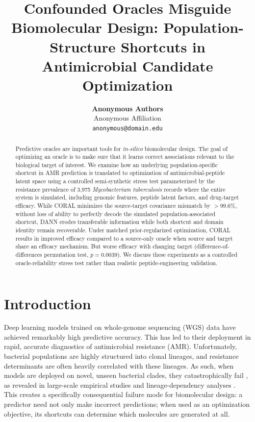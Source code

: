 \documentclass{article}
\title{Confounded Oracles Misguide Biomolecular Design: Population-Structure Shortcuts in Antimicrobial Candidate Optimization}
\author{
  \textbf{Anonymous Authors} \\
  Anonymous Affiliation \\
  \texttt{anonymous@domain.edu}
}
\begin{document}
\maketitle

\begin{abstract}
Predictive oracles are important tools for \textit{in-silico} biomolecular design. The goal of optimizing an oracle is to make sure that it learns correct associations relevant to the biological target of interest. We examine how an underlying population-specific shortcut in AMR prediction is translated to optimization of antimicrobial-peptide latent space using a controlled semi-synthetic stress test parameterized by the resistance prevalence of 3,975 \textit{Mycobacterium tuberculosis} records where the entire system is simulated, including genomic features, peptide latent factors, and drug-target efficacy. While CORAL minimizes the source-target covariance mismatch by $>$99.6\%, without loss of ability to perfectly decode the simulated population-associated shortcut, DANN erodes transferable information while both shortcut and domain identity remain recoverable. Under matched prior-regularized optimization, CORAL results in improved efficacy compared to a source-only oracle when source and target share an efficacy mechanism. But worse efficacy with changing target (difference-of-differences permutation test, $p = 0.0039$). We discuss these experiments as a controlled oracle-reliability stress test rather than realistic peptide-engineering validation.
\end{abstract}

\section{Introduction}
Deep learning models trained on whole-genome sequencing (WGS) data have achieved remarkably high predictive accuracy. This has led to their deployment in rapid, accurate diagnostics of antimicrobial resistance (AMR). Unfortunately, bacterial populations are highly structured into clonal lineages, and resistance determinants are often heavily correlated with these lineages. As such, when models are deployed on novel, unseen bacterial clades, they catastrophically fail \cite{yu2025population}, as revealed in large-scale empirical studies and lineage-dependency analyses \cite{billows2023mtb}. This creates a specifically consequential failure mode for biomolecular design: a predictor need not only make incorrect predictions; when used as an optimization objective, its shortcuts can determine which molecules are generated at all.
\end{document}
